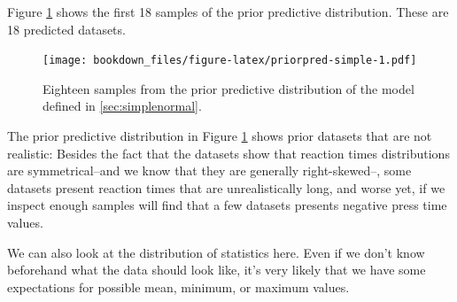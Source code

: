 \documentclass[12pt,]{krantz}
\newenvironment{Shaded}{\begin{snugshade}}{\end{snugshade}}
\newcommand{\KeywordTok}[1]{\textcolor[rgb]{0.13,0.29,0.53}{\textbf{#1}}}
\newcommand{\DataTypeTok}[1]{\textcolor[rgb]{0.13,0.29,0.53}{#1}}
\newcommand{\DecValTok}[1]{\textcolor[rgb]{0.00,0.00,0.81}{#1}}
\newcommand{\StringTok}[1]{\textcolor[rgb]{0.31,0.60,0.02}{#1}}
\newcommand{\OperatorTok}[1]{\textcolor[rgb]{0.81,0.36,0.00}{\textbf{#1}}}
\newcommand{\NormalTok}[1]{#1}
\theoremstyle{definition}
\theoremstyle{definition}
\theoremstyle{definition}
\theoremstyle{remark}
\begin{document}
Figure \ref{fig:priorpred-simple} shows the first 18 samples of the
prior predictive distribution. These are 18 predicted datasets.




\begin{Shaded}
\end{Shaded}

\begin{figure}
\centering
\texttt{[image: bookdown\_files/figure-latex/priorpred-simple-1.pdf]}
\caption{\label{fig:priorpred-simple}Eighteen samples from the prior predictive
distribution of the model defined in \ref{sec:simplenormal}.}
\end{figure}

The prior predictive distribution in Figure \ref{fig:priorpred-simple}
shows prior datasets that are not realistic: Besides the fact that the
datasets show that reaction times distributions are symmetrical--and we
know that they are generally right-skewed--, some datasets present
reaction times that are unrealistically long, and worse yet, if we
inspect enough samples will find that a few datasets presents negative
press time values.

We can also look at the distribution of statistics here. Even if we
don't know beforehand what the data should look like, it's very likely
that we have some expectations for possible mean, minimum, or maximum
values.
\end{document}
